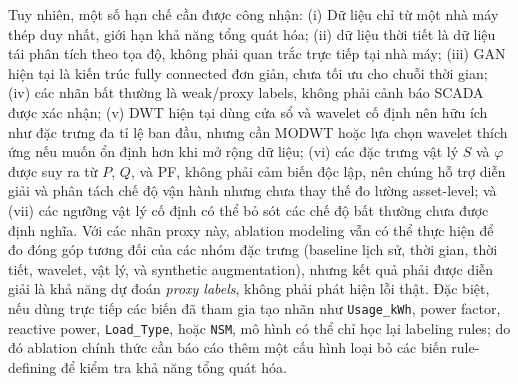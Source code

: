 Tuy nhiên, một số hạn chế cần được công nhận:
(i) Dữ liệu chỉ từ một nhà máy thép duy nhất, giới hạn khả năng tổng quát hóa;
(ii) dữ liệu thời tiết là dữ liệu tái phân tích theo tọa độ, không phải quan trắc trực tiếp tại nhà máy;
(iii) GAN hiện tại là kiến trúc fully connected đơn giản, chưa tối ưu cho chuỗi thời gian;
(iv) các nhãn bất thường là weak/proxy labels, không phải cảnh báo SCADA được xác nhận;
(v) DWT hiện tại dùng cửa sổ và wavelet cố định nên hữu ích như đặc trưng đa tỉ lệ ban đầu,
nhưng cần MODWT hoặc lựa chọn wavelet thích ứng nếu muốn ổn định hơn khi mở rộng dữ liệu;
(vi) các đặc trưng vật lý $S$ và $\varphi$ được suy ra từ $P$, $Q$, và PF, không phải cảm biến độc lập,
nên chúng hỗ trợ diễn giải và phân tách chế độ vận hành nhưng chưa thay thế đo lường asset-level;
và (vii) các ngưỡng vật lý cố định có thể bỏ sót các chế độ bất thường chưa được định nghĩa.
Với các nhãn proxy này, ablation modeling vẫn có thể thực hiện để đo đóng góp tương đối của các nhóm đặc trưng
(baseline lịch sử, thời gian, thời tiết, wavelet, vật lý, và synthetic augmentation),
nhưng kết quả phải được diễn giải là khả năng dự đoán \textit{proxy labels}, không phải phát hiện lỗi thật.
Đặc biệt, nếu dùng trực tiếp các biến đã tham gia tạo nhãn như \texttt{Usage\_kWh}, power factor,
reactive power, \texttt{Load\_Type}, hoặc \texttt{NSM}, mô hình có thể chỉ học lại labeling rules;
do đó ablation chính thức cần báo cáo thêm một cấu hình loại bỏ các biến rule-defining để kiểm tra khả năng tổng quát hóa.

